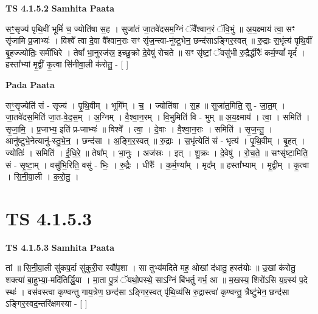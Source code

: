 \documentclass[17pt]{extarticle}
\begin{document}
\textbf{TS 4.1.5.2 } \newline
\textbf{Samhita Paata} \newline

सꣳ॒॒सृज्य॑ पृथि॒वीं भूमिं॑ च॒ ज्योति॑षा स॒ह । सुजा॑तं जा॒तवे॑दसम॒ग्निं ॅवै᳚श्वान॒रं ॅवि॒भुं ॥ अ॒य॒क्ष्माय॑ त्वा॒ सꣳ सृ॑जामि प्र॒जाभ्यः॑ । विश्वे᳚ त्वा दे॒वा वै᳚श्वान॒राः सꣳ सृ॑ज॒न्त्वा-नु॑ष्टुभेन॒ छन्द॑साऽङ्गिर॒स्वत् ॥ रु॒द्राः स॒भृंत्य॑ पृथि॒वीं बृ॒हज्ज्योतिः॒ समी॑धिरे । तेषां᳚ भा॒नुरज॑स्र॒ इच्छु॒क्रो दे॒वेषु॑ रोचते ॥ सꣳ सृ॑ष्टां॒ ॅवसु॑भी रु॒द्रैर्द्धीरैः᳚ कर्म॒ण्यां᳚ मृदं᳚ । हस्ता᳚भ्यां मृ॒द्वीं कृ॒त्वा सि॑नीवा॒ली क॑रोतु॒ - [  ] \newline

\textbf{Pada Paata} \newline

सꣳ॒॒सृज्येति॑ सं - सृज्य॑ । पृ॒थि॒वीम् । भूमि᳚म् । च॒ । ज्योति॑षा । स॒ह ॥ सुजा॑त॒मिति॒ सु - जा॒त॒म् । जा॒तवे॑दस॒मिति॑ जा॒त-वे॒द॒स॒म् । अ॒ग्निम् । वै॒श्वा॒न॒रम् । वि॒भुमिति॑ वि - भुम् ॥ अ॒य॒क्ष्माय॑ । त्वा॒ । समिति॑ । सृ॒जा॒मि॒ । प्र॒जाभ्य॒ इति॑ प्र-जाभ्यः॑ ॥ विश्वे᳚ । त्वा॒ । दे॒वाः । वै॒श्वा॒न॒राः । समिति॑ । सृ॒ज॒न्तु॒ । आनु॑ष्टुभे॒नेत्यानु॑-स्तु॒भे॒न॒ । छन्द॑सा । अ॒ङ्गि॒र॒स्वत् ॥ रु॒द्राः । स॒भृंत्येति॑ सं - भृत्य॑ । पृ॒थि॒वीम् । बृ॒हत् । ज्योतिः॑ । समिति॑ । ई॒धि॒रे॒ ॥ तेषा᳚म् । भा॒नुः । अज॑स्रः । इत् । शु॒क्रः । दे॒वेषु॑ । रो॒च॒ते॒ ॥ सꣳसृ॑ष्टा॒मिति॒ सं - सृ॒ष्टा॒म् । वसु॑भि॒रिति॒ वसु॑ - भिः॒ । रु॒द्रैः । धीरैः᳚ । क॒र्म॒ण्या᳚म् । मृद᳚म् ॥ हस्ता᳚भ्याम् । मृ॒द्वीम् । कृ॒त्वा । सि॒नी॒वा॒ली । क॒रो॒तु॒ ।  \newline




\section*{ TS 4.1.5.3 }

\textbf{TS 4.1.5.3 } \newline
\textbf{Samhita Paata} \newline

तां ॥ सि॒नी॒वा॒ली सु॑कप॒र्दा सु॑कुरी॒रा स्वौ॑प॒शा । सा तुभ्य॑मदिते मह॒ ओखां द॑धातु॒ हस्त॑योः ॥ उ॒खां क॑रोतु॒ शक्त्या॑ बा॒हुभ्या॒-मदि॑तिर्द्धि॒या । मा॒ता पु॒त्रं ॅयथो॒पस्थे॒ साऽग्निं बि॑भर्तु॒ गर्भ॒ आ ॥ म॒खस्य॒ शिरो॑ऽसि य॒ज्ञ्स्य॑ प॒दे स्थः॑ । वस॑वस्त्वा कृण्वन्तु गाय॒त्रेण॒ छन्द॑सा ऽङ्गिर॒स्वत् पृ॑थि॒व्य॑सि रु॒द्रास्त्वा॑ कृण्वन्तु॒ त्रैष्टु॑भेन॒ छन्द॑सा ऽङ्गिर॒स्वद॒न्तरि॑क्षमस्या - [  ] \newline
\end{document}
